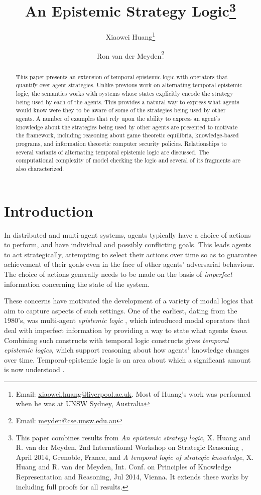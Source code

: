 \documentclass[a4wide]{article}
\title{An Epistemic Strategy Logic\footnote{This paper combines results 
from \cite{HM-SR14} {\em An epistemic strategy logic}, X. Huang and R. van der Meyden, 2nd International Workshop on Strategic Reasoning , April 2014, Grenoble, France, 
and \cite{HvdM2014} {\em A temporal logic of strategic knowledge}, X. Huang and R. van der Meyden, Int. Conf. on Principles of Knowledge Representation and Reasoning, Jul 2014, Vienna. 
It extends these works by including full proofs for all results. 
}}
\author[1]{Xiaowei Huang\thanks{Email: \href{mailto: xiaowei.huang@liverpool.ac.uk}{xiaowei.huang@liverpool.ac.uk}. Most of Huang's work was performed when he was at 
UNSW Sydney, Australia}}
\author[2]{Ron van der Meyden\thanks{Email: \href{mailto: meyden@cse.unsw.edu.au}{meyden@cse.unsw.edu.au}}}
\affil[1]{The University of Liverpool, UK}
\affil[2]{UNSW Sydney, Australia}
\date{
}
\theoremstyle{examplesty}
\begin{document}
\maketitle




\begin{abstract}
This paper presents an extension of temporal epistemic logic with operators that quantify over agent  strategies. 
Unlike previous work on alternating temporal epistemic logic, the semantics works with systems whose 
states explicitly encode the strategy being used by each of the agents.  
This provides a natural way to express  what agents would know were they to be
aware of 
some of 
the strategies  being used by other agents. A number of examples 
that rely upon the ability to express an agent's knowledge about the strategies 
being used by other agents are presented 
to motivate the framework, including reasoning about game theoretic equilibria, 
knowledge-based programs, and information theoretic computer security policies.  Relationships to 
several variants of alternating temporal epistemic logic are 
discussed. The computational complexity of model checking the logic  and several of its 
fragments are also characterized.
\end{abstract}

\section{Introduction}

In distributed and multi-agent systems, agents typically  have a choice of actions to perform, and 
have individual and possibly conflicting goals. This leads agents to act strategically, attempting to select their actions over time so as to guarantee achievement of their goals even 
in the face of other agents' adversarial behaviour. The choice of actions generally needs to be 
made 
on the basis of {\em imperfect} information concerning the state of the 
system. 

These concerns have motivated the development of a variety of modal logics that aim to capture aspects of such settings. 
One of the earliest, dating from the 1980's, was multi-agent \emph{epistemic logic} \cite{HM90,RamParikh84}, which 
introduced
modal operators that deal with imperfect information 
by providing a way to state what  agents {\em know}. Combining such constructs with temporal logic  constructs \cite{Pnueli1977}
gives \emph{temporal epistemic logics}, which support reasoning about how agents' knowledge changes over time. 
Temporal-epistemic logic is an area about which a significant amount is now understood \cite{FHMVbook}. 
\end{document}
